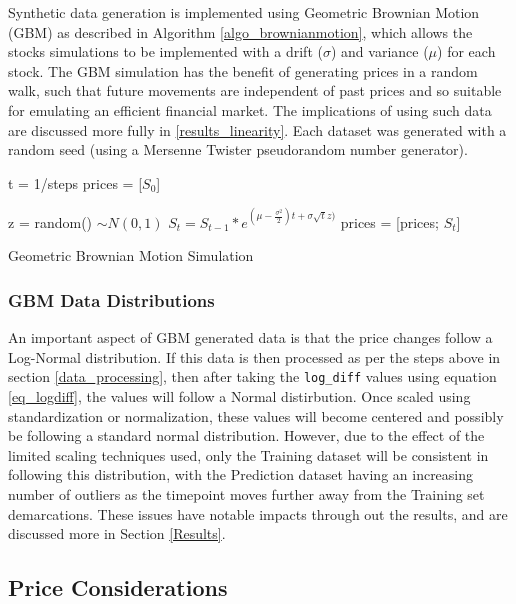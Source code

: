 \documentclass[a4paper,11pt,oneside]{article}
\theoremstyle{plain}
\theoremstyle{definition}
\begin{document}
Synthetic data generation is implemented using Geometric Brownian Motion (GBM) as described in Algorithm \ref{algo_brownianmotion}, which allows the stocks simulations to be implemented with a drift ($\sigma$) and variance ($\mu$) for each stock. The GBM simulation has the benefit of generating prices in a random walk, such that future movements are independent of past prices and so suitable for emulating an efficient financial market. The implications of using such data are discussed more fully in \ref{results_linearity}. Each dataset was generated with a random seed (using a Mersenne Twister pseudorandom number generator). \newline

\begin{algorithm}[H]

	t = 1/steps\;
	prices = [$S_0$]\;

	{
		z = random()  $\sim N(0,1)$\;
		$S_t = S_{t-1}*e^{(\mu - \frac {\sigma^2}{2})t + \sigma  \sqrt{t}  z)}$\;
		prices = [prices; $S_t$]\;
	}
	\label{algo_brownianmotion}
	\caption{Geometric Brownian Motion Simulation}
\end{algorithm}

\subsubsection{GBM Data Distributions}

An important aspect of GBM generated data is that the price changes follow a Log-Normal distribution. If this data is then processed as per the steps above in section \ref{data_processing}, then after taking the \texttt{log\_diff} values using equation \eqref{eq_logdiff}, the values will follow a Normal distirbution. Once scaled using standardization or normalization, these values will become centered and possibly be following a standard normal distribution. However, due to the effect of the limited scaling techniques used, only the Training dataset will be consistent in following this distribution, with the Prediction dataset having an increasing number of outliers as the timepoint moves further away from the Training set demarcations. These issues have notable impacts through out the results, and are discussed more in Section \ref{Results}.

\subsection{Price Considerations}\label{data_prices}
\end{document}
